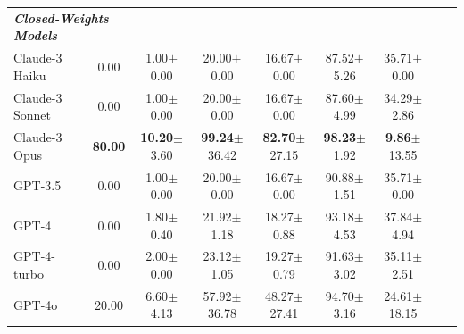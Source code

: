 \documentclass{article}
\begin{document}
\begin{table}[h]
\begin{tabular}{lcccccccc}
\midrule
\multicolumn{2}{l}{\textbf{\textit{Closed-Weights Models}}}\\
Claude-3 Haiku & 0.00 & 1.00\tiny{$\pm$0.00} & 20.00\tiny{$\pm$0.00} & 16.67\tiny{$\pm$0.00} & 87.52\tiny{$\pm$5.26} & 35.71\tiny{$\pm$0.00} \\
Claude-3 Sonnet & 0.00 & 1.00\tiny{$\pm$0.00} & 20.00\tiny{$\pm$0.00} & 16.67\tiny{$\pm$0.00} & 87.60\tiny{$\pm$4.99} & 34.29\tiny{$\pm$2.86} \\
Claude-3 Opus & \textbf{80.00} & \textbf{10.20}\tiny{$\pm$3.60} & \textbf{99.24}\tiny{$\pm$36.42} & \textbf{82.70}\tiny{$\pm$27.15} & \textbf{98.23}\tiny{$\pm$1.92} & \textbf{9.86}\tiny{$\pm$13.55} \\
GPT-3.5 & 0.00 & 1.00\tiny{$\pm$0.00} & 20.00\tiny{$\pm$0.00} & 16.67\tiny{$\pm$0.00} & 90.88\tiny{$\pm$1.51} & 35.71\tiny{$\pm$0.00} \\
GPT-4 & 0.00 & 1.80\tiny{$\pm$0.40} & 21.92\tiny{$\pm$1.18} & 18.27\tiny{$\pm$0.88} & 93.18\tiny{$\pm$4.53} & 37.84\tiny{$\pm$4.94} \\
GPT-4-turbo & 0.00 & 2.00\tiny{$\pm$0.00} & 23.12\tiny{$\pm$1.05} & 19.27\tiny{$\pm$0.79} & 91.63\tiny{$\pm$3.02} & 35.11\tiny{$\pm$2.51} \\
GPT-4o & 20.00 & 6.60\tiny{$\pm$4.13} & 57.92\tiny{$\pm$36.78} & 48.27\tiny{$\pm$27.41} & 94.70\tiny{$\pm$3.16} & 24.61\tiny{$\pm$18.15} \\
\bottomrule
\end{tabular}

\end{table}

\clearpage
\end{document}
